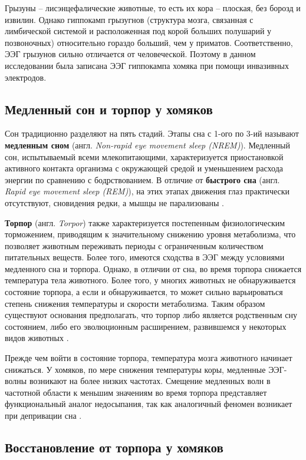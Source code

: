 \documentclass[12pt,a4paper,oneside]{article}
\begin{document}
Грызуны -- лисэнцефалические животные, то есть их кора -- плоская, без борозд и извилин. Однако гиппокамп грызугнов (структура мозга, связанная с лимбической системой и расположенная под корой больших полушарий у позвоночных) относительно гораздо больший, чем у приматов. Соответственно, ЭЭГ грызунов сильно отличается от человеческой. Поэтому в данном исследовании была записана ЭЭГ гиппокампа хомяка при помощи инвазивных электродов. 

\subsection{Медленный сон и торпор у хомяков}

Сон традиционно разделяют на пять стадий. Этапы сна с 1-ого по 3-ий называют \textbf{медленным сном} (англ. \textit{Non-rapid eye movement sleep (NREM)}). Медленный сон, испытываемый всеми млекопитающими, характеризуется приостановкой активного контакта организма с окружающей средой и уменьшением расхода энергии по сравнению с бодрствованием. В отличие от \textbf{быстрого сна} (англ. \textit{Rapid eye movement sleep (REM)}), на этих этапах движения глаз практически отсутствуют, сновидения редки, а мышцы не парализованы \cite{McCarley2007}. 

\textbf{Торпор} (англ. \textit{Torpor}) также характеризуется постепенным физиологическим торможением, приводящим к значительному снижению уровня метаболизма, что позволяет животным переживать периоды с ограниченным количеством питательных веществ. Более того, имеются сходства в ЭЭГ между условиями медленного сна и торпора. Однако, в отличии от сна, во время торпора снижается температура тела животного. Более того, у многих животных не обнаруживается состояние торпора, а если и обнаруживается, то может сильно варьироваться степень снижения температуры и скорости метаболизма. Таким образом существуют основания предполагать, что торпор либо является родственным сну состоянием, либо его эволюционным расширением, развившемся у некоторых видов животных \cite{Silvani2018}. 

Прежде чем войти в состояние торпора, температура мозга животного начинает снижаться. У хомяков, по мере снижения температуры коры, медленные ЭЭГ-волны возникают на более низких частотах. Смещение медленных волн в частотной области к меньшим значениям во время торпора представляет функциональный аналог недосыпания, так как аналогичный феномен возникает при депривации сна \cite{Silvani2018}.

\subsection{Восстановление от торпора у хомяков}
\end{document}
